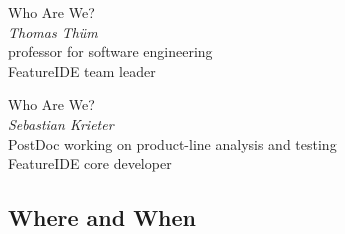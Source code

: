 \begin{frame}{\myframetitle}
	\begin{fancycolumns}[animation=none]
		\begin{note}{Who Are We?}
			\centering
			\\[.5ex]
			\emph{Thomas Thüm}\\[.5ex]
			\small professor for software engineering\\[.5ex]
			FeatureIDE team leader
		\end{note}
	\nextcolumn
		\begin{note}{Who Are We?}
		    \centering
		    \\[.5ex]
			\emph{Sebastian Krieter}\\[.5ex]
			\small PostDoc working on product-line analysis and testing\\[.5ex]
			FeatureIDE core developer
		\end{note}
	\end{fancycolumns}
\end{frame}

\subsection{Where and When}

